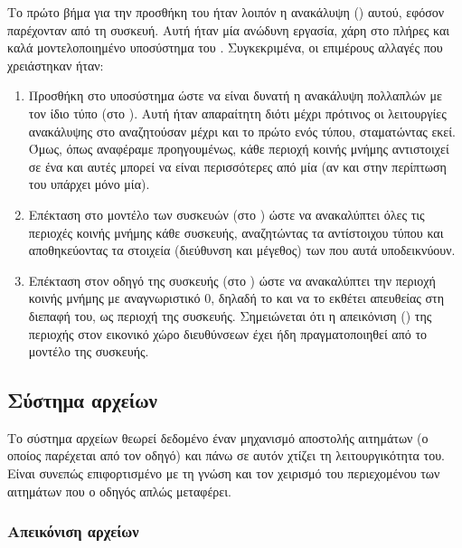 Το πρώτο βήμα για την προσθήκη του  ήταν λοιπόν η ανακάλυψη
() αυτού, εφόσον παρέχονταν από τη συσκευή. Αυτή ήταν μία ανώδυνη
εργασία, χάρη στο πλήρες και καλά μοντελοποιημένο υποσύστημα  του
\osv{}. Συγκεκριμένα, οι επιμέρους αλλαγές που χρειάστηκαν ήταν:
\begin{enumerate}
    \item Προσθήκη στο  υποσύστημα ώστε να είναι δυνατή η ανακάλυψη
          πολλαπλών  με τον ίδιο τύπο (στο
          ). Αυτή ήταν απαραίτητη διότι μέχρι
          πρότινος οι λειτουργίες ανακάλυψης στο \osv{} αναζητούσαν μέχρι και το
          πρώτο  ενός τύπου, σταματώντας εκεί. Όμως, όπως
          αναφέραμε προηγουμένως, κάθε περιοχή κοινής μνήμης αντιστοιχεί σε ένα
           και αυτές μπορεί να είναι περισσότερες από μία (αν
          και στην περίπτωση του \viofs{} υπάρχει μόνο μία).
    \item Επέκταση στο μοντέλο των  συσκευών (στο    %
          ) ώστε να ανακαλύπτει όλες τις
          περιοχές κοινής μνήμης κάθε συσκευής, αναζητώντας τα 
          αντίστοιχου τύπου και αποθηκεύοντας τα στοιχεία (διεύθυνση και
          μέγεθος) των  που αυτά υποδεικνύουν.
    \item Επέκταση στον οδηγό της \viofs{} συσκευής (στο
          ) ώστε να ανακαλύπτει την περιοχή κοινής
          μνήμης με αναγνωριστικό 0, δηλαδή το  και να το εκθέτει
          απευθείας στη διεπαφή του, ως περιοχή 
          της συσκευής. Σημειώνεται ότι η απεικόνιση () της περιοχής
          στον εικονικό χώρο διευθύνσεων έχει ήδη πραγματοποιηθεί από το μοντέλο
          της συσκευής.
\end{enumerate}

\subsection{Σύστημα αρχείων}

Το \viofs{} σύστημα αρχείων θεωρεί δεδομένο έναν μηχανισμό αποστολής 
αιτημάτων (ο οποίος παρέχεται από τον οδηγό) και πάνω σε αυτόν χτίζει τη
λειτουργικότητα του. Είναι συνεπώς επιφορτισμένο με τη γνώση και τον
χειρισμό του περιεχομένου των αιτημάτων που ο οδηγός απλώς μεταφέρει.

\subsubsection{Απεικόνιση αρχείων}


